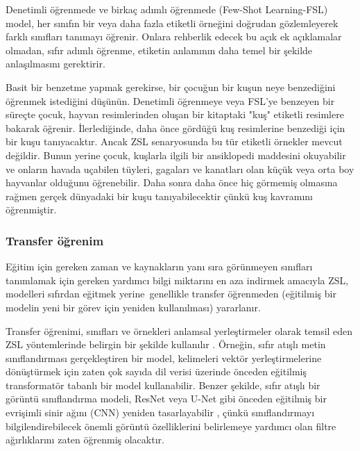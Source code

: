 \documentclass[10pt,a4paper]{report}
\begin{document}
\begin{justify}
	
	Denetimli öğrenmede ve birkaç adımlı öğrenmede (Few-Shot Learning-FSL) model, her sınıfın bir veya daha fazla etiketli örneğini doğrudan gözlemleyerek farklı sınıfları tanımayı öğrenir. Onlara rehberlik edecek bu açık ek açıklamalar olmadan, sıfır adımlı öğrenme, etiketin anlamının daha temel bir şekilde anlaşılmasını gerektirir. \newline
	
	
	
	Basit bir benzetme yapmak gerekirse, bir çocuğun bir kuşun neye benzediğini öğrenmek istediğini düşünün. Denetimli öğrenmeye veya FSL'ye benzeyen bir süreçte çocuk, hayvan resimlerinden oluşan bir kitaptaki "kuş" etiketli resimlere bakarak öğrenir. İlerlediğinde, daha önce gördüğü kuş resimlerine benzediği için bir kuşu tanıyacaktır. Ancak ZSL senaryosunda bu tür etiketli örnekler mevcut değildir. Bunun yerine çocuk, kuşlarla ilgili bir ansiklopedi maddesini okuyabilir ve onların havada uçabilen tüyleri, gagaları ve kanatları olan küçük veya orta boy hayvanlar olduğunu öğrenebilir. Daha sonra daha önce hiç görmemiş olmasına rağmen gerçek dünyadaki bir kuşu tanıyabilecektir çünkü kuş kavramını öğrenmiştir.\newline
	\subsubsection{Transfer öğrenim}
	
	Eğitim için gereken zaman ve kaynakların yanı sıra görünmeyen sınıfları tanımlamak için gereken yardımcı bilgi miktarını en aza indirmek amacıyla ZSL, modelleri sıfırdan eğitmek yerine  genellikle transfer öğrenmeden (eğitilmiş bir modelin yeni bir görev için yeniden kullanılması) yararlanır.\newline
	
	Transfer öğrenimi, sınıfları ve örnekleri anlamsal yerleştirmeler olarak temsil eden ZSL yöntemlerinde belirgin bir şekilde kullanılır . Örneğin, sıfır atışlı metin sınıflandırması gerçekleştiren bir model, kelimeleri vektör yerleştirmelerine dönüştürmek için zaten çok sayıda dil verisi üzerinde önceden eğitilmiş transformatör tabanlı bir model kullanabilir. Benzer şekilde, sıfır atışlı bir görüntü sınıflandırma modeli, ResNet veya U-Net gibi önceden eğitilmiş bir evrişimli sinir ağını (CNN) yeniden tasarlayabilir , çünkü sınıflandırmayı bilgilendirebilecek önemli görüntü özelliklerini belirlemeye yardımcı olan filtre ağırlıklarını zaten öğrenmiş olacaktır.\newline
	

\end{justify}
\end{document}
